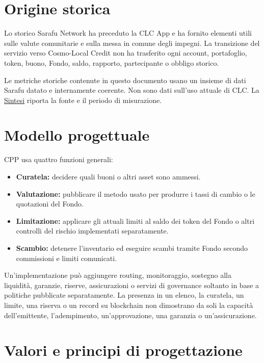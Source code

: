 \documentclass[11pt]{article}
\begin{document}
\section*{Origine storica}

Lo storico Sarafu Network ha preceduto la CLC App e ha fornito elementi utili sulle valute comunitarie e sulla messa in comune degli impegni. La transizione del servizio verso Cosmo-Local Credit non ha trasferito ogni account, portafoglio, token, buono, Fondo, saldo, rapporto, partecipante o obbligo storico.

Le metriche storiche contenute in questo documento usano un insieme di dati Sarafu datato e internamente coerente. Non sono dati sull'uso attuale di CLC. La \href{https://docs.cosmolocal.credit/it/white-paper/executive-summary}{Sintesi} riporta la fonte e il periodo di misurazione.

\section*{Modello progettuale}

CPP usa quattro funzioni generali:

\begin{itemize}[leftmargin=*]
\item \textbf{Curatela:} decidere quali buoni o altri asset sono ammessi.
\item \textbf{Valutazione:} pubblicare il metodo usato per produrre i tassi di cambio o le quotazioni del Fondo.
\item \textbf{Limitazione:} applicare gli attuali limiti al saldo dei token del Fondo o altri controlli del rischio implementati separatamente.
\item \textbf{Scambio:} detenere l'inventario ed eseguire scambi tramite Fondo secondo commissioni e limiti comunicati.
\end{itemize}
Un'implementazione può aggiungere routing, monitoraggio, sostegno alla liquidità, garanzie, riserve, assicurazioni o servizi di governance soltanto in base a politiche pubblicate separatamente. La presenza in un elenco, la curatela, un limite, una riserva o un record su blockchain non dimostrano da soli la capacità dell'emittente, l'adempimento, un'approvazione, una garanzia o un'assicurazione.

\section*{Valori e principi di progettazione}
\end{document}
